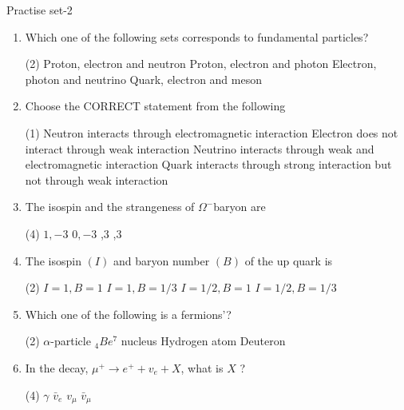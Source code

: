 \begin{abox}
	Practise set-2
\end{abox}
\begin{enumerate}
	\item  Which one of the following sets corresponds to fundamental particles?
	 {}
	 \begin{tasks}(2)
		\task[\textbf{a.}]Proton, electron and neutron
		\task[\textbf{b.}]Proton, electron and photon
		\task[\textbf{c.}]Electron, photon and neutrino
		\task[\textbf{d.}]Quark, electron and meson 
	\end{tasks}

	\item  Choose the CORRECT statement from the following
	 \begin{tasks}(1)
		\task[\textbf{a.}]Neutron interacts through electromagnetic interaction
		\task[\textbf{b.}]Electron does not interact through weak interaction
		\task[\textbf{c.}]Neutrino interacts through weak and electromagnetic interaction
		\task[\textbf{d.}] Quark interacts through strong interaction but not through weak interaction
	\end{tasks}

	\item  The isospin and the strangeness of $\Omega^{-}$baryon are
	{}
	 \begin{tasks}(4)
		\task[\textbf{a.}]$1,-3$
		\task[\textbf{b.}]$0,-3$
		,3
		,3 
	\end{tasks}

	\item The isospin $(I)$ and baryon number $(B)$ of the up quark is
	{}
	 \begin{tasks}(2)
		\task[\textbf{a.}]$I=1, B=1$
		\task[\textbf{b.}]$I=1, B=1 / 3$
		\task[\textbf{c.}]$I=1 / 2, B=1$
		\task[\textbf{d.}]$I=1 / 2, B=1 / 3$ 
	\end{tasks}

	\item  Which one of the following is a fermions'?
	{}
	 \begin{tasks}(2)
		\task[\textbf{a.}]$\alpha$-particle
		\task[\textbf{b.}]${ }_4 B e^7$ nucleus
		\task[\textbf{c.}]Hydrogen atom
		\task[\textbf{d.}]Deuteron 
	\end{tasks}

	\item  In the decay, $\mu^{+} \rightarrow e^{+}+v_e+X$, what is $X$ ?
	{}
	 \begin{tasks}(4)
		\task[\textbf{a.}]$\gamma$
		\task[\textbf{b.}]$\bar{v}_e$
		\task[\textbf{c.}]$v_\mu$
		\task[\textbf{d.}]$\bar{v}_\mu$ 
	\end{tasks}


\end{enumerate}
